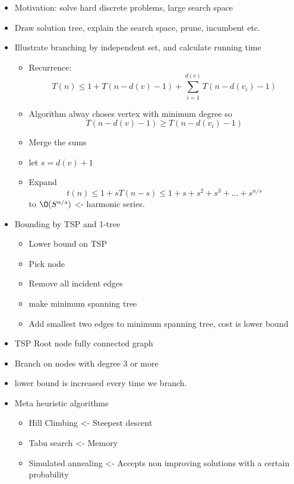 \documentclass[10pt]{article}
\begin{document}
\begin{itemize}
  \item Motivation: solve hard discrete problems, large search space
  \item Draw solution tree, explain the search space, prune, incumbent etc.
  \item Illustrate branching by independent set, and calculate running time
  \begin{itemize}
    \item Recurrence: \begin{equation}
      T(n) \leq 1 + T(n-d(v)-1) + \sum_{i=1}^{d(v)} T(n-d(v_i)-1)
    \end{equation}
    \item Algorithm alway choses vertex with minimum degree so  
    \begin{equation}
      T(n-d(v)-1) \geq T(n-d(v_i)-1)      
    \end{equation}
    \item Merge the sums
    \item let $s = d(v)+1$
    \item Expand 
    \begin{equation}
      t(n) \leq 1 + sT(n-s) \leq 1 + s + s^2+s^3+\ldots+s^{n/s} 
    \end{equation} to $\O(S^{n/s})$ <- harmonic series.
  \end{itemize}  
  \item Bounding by TSP and 1-tree
  \begin{itemize}
    \item Lower bound on TSP
    \item Pick node
    \item Remove all incident edges
    \item make minimum spanning tree
    \item Add smallest two edges to minimum spanning tree, cost is lower bound
  \end{itemize}
  \item TSP Root node fully connected graph
  \item Branch on nodes with degree 3 or more
  \item lower bound is increased every time we branch.
  \item Meta heuristic algorithms
  \begin{itemize}
    \item Hill Climbing <- Steepest descent
    \item Tabu search <- Memory
    \item Simulated annealing <- Accepts non improving solutions with a certain probability
  \end{itemize}
\end{itemize}
\newpage
\end{document}
